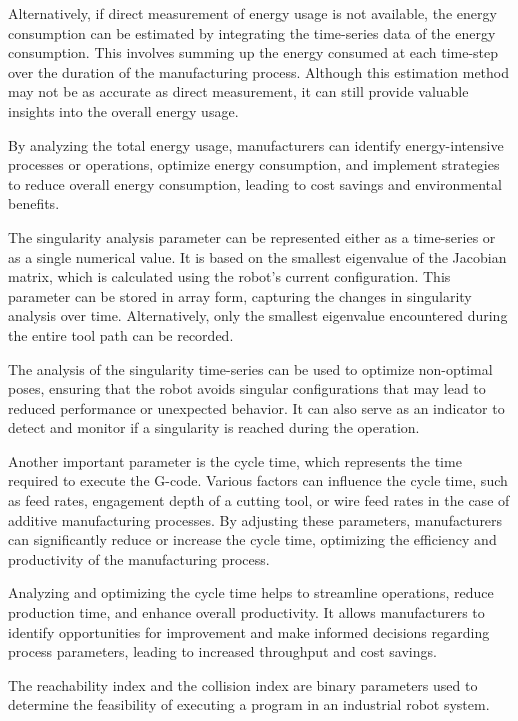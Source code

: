 Alternatively, if direct measurement of energy usage is not available, the energy consumption can be estimated by integrating the time-series data of the energy consumption. This involves summing up the energy consumed at each time-step over the duration of the manufacturing process. Although this estimation method may not be as accurate as direct measurement, it can still provide valuable insights into the overall energy usage.

By analyzing the total energy usage, manufacturers can identify energy-intensive processes or operations, optimize energy consumption, and implement strategies to reduce overall energy consumption, leading to cost savings and environmental benefits.

The singularity analysis parameter can be represented either as a time-series or as a single numerical value. It is based on the smallest eigenvalue of the Jacobian matrix, which is calculated using the robot's current configuration. This parameter can be stored in array form, capturing the changes in singularity analysis over time. Alternatively, only the smallest eigenvalue encountered during the entire tool path can be recorded.

The analysis of the singularity time-series can be used to optimize non-optimal poses, ensuring that the robot avoids singular configurations that may lead to reduced performance or unexpected behavior. It can also serve as an indicator to detect and monitor if a singularity is reached during the operation.

Another important parameter is the cycle time, which represents the time required to execute the G-code. Various factors can influence the cycle time, such as feed rates, engagement depth of a cutting tool, or wire feed rates in the case of additive manufacturing processes. By adjusting these parameters, manufacturers can significantly reduce or increase the cycle time, optimizing the efficiency and productivity of the manufacturing process.

Analyzing and optimizing the cycle time helps to streamline operations, reduce production time, and enhance overall productivity. It allows manufacturers to identify opportunities for improvement and make informed decisions regarding process parameters, leading to increased throughput and cost savings.


The reachability index and the collision index are binary parameters used to determine the feasibility of executing a program in an industrial robot system.

